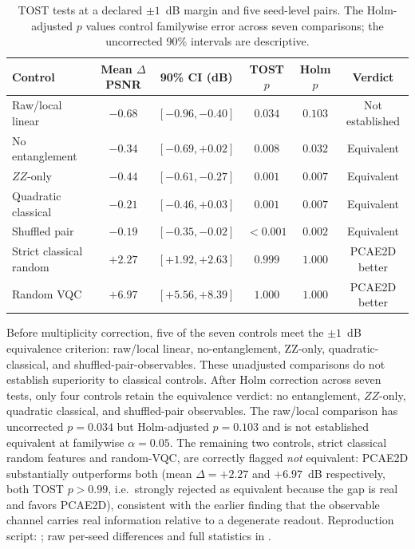 \documentclass[11pt]{article}
\begin{document}
\begin{table}[H]
\centering
\caption{TOST tests at a declared $\pm1$~dB margin and five seed-level pairs. The Holm-adjusted $p$ values control familywise error across seven comparisons; the uncorrected 90\% intervals are descriptive.}
\label{tab:tost_equivalence}
\scriptsize
\begin{tabular}{lccccc}
\toprule
Control & Mean $\Delta$PSNR & 90\% CI (dB) & TOST $p$ & Holm $p$ & Verdict \\
\midrule
Raw/local linear & $-0.68$ & $[-0.96,-0.40]$ & $0.034$ & $0.103$ & Not established \\
No entanglement & $-0.34$ & $[-0.69,+0.02]$ & $0.008$ & $0.032$ & Equivalent \\
$ZZ$-only & $-0.44$ & $[-0.61,-0.27]$ & $0.001$ & $0.007$ & Equivalent \\
Quadratic classical & $-0.21$ & $[-0.46,+0.03]$ & $0.001$ & $0.007$ & Equivalent \\
Shuffled pair & $-0.19$ & $[-0.35,-0.02]$ & $<0.001$ & $0.002$ & Equivalent \\
Strict classical random & $+2.27$ & $[+1.92,+2.63]$ & $0.999$ & $1.000$ & PCAE2D better \\
Random VQC & $+6.97$ & $[+5.56,+8.39]$ & $1.000$ & $1.000$ & PCAE2D better \\
\bottomrule
\end{tabular}
\end{table}

Before multiplicity correction, five of the seven controls meet the $\pm1$~dB equivalence criterion: raw/local linear, no-entanglement, ZZ-only, quadratic-classical, and shuffled-pair-observables. These unadjusted comparisons do not establish superiority to classical controls. After Holm correction across seven tests, only four controls retain the equivalence verdict: no entanglement, $ZZ$-only, quadratic classical, and shuffled-pair observables. The raw/local comparison has uncorrected $p=0.034$ but Holm-adjusted $p=0.103$ and is not established equivalent at familywise $\alpha=0.05$. The remaining two controls, strict classical random features and random-VQC, are correctly flagged \emph{not} equivalent: PCAE2D substantially outperforms both (mean $\Delta=+2.27$ and $+6.97$~dB respectively, both TOST $p>0.99$, i.e.\ strongly rejected as equivalent because the gap is real and favors PCAE2D), consistent with the earlier finding that the observable channel carries real information relative to a degenerate readout. Reproduction script: ; raw per-seed differences and full statistics in .
\end{document}
